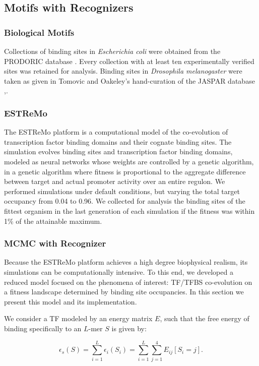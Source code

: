 \documentclass{article}
\begin{document}
\subsection{Motifs with Recognizers}
\subsubsection{Biological Motifs}
Collections of binding sites in \textit{Escherichia coli} were
obtained from the PRODORIC database \cite{prodoric03}.  Every
collection with at least ten experimentally verified sites was
retained for analysis.  Binding sites in \textit{Drosophila
  melanogaster} were taken as given in Tomovic and Oakeley's
hand-curation of the JASPAR database \cite{tomovic07},\cite{jaspar}.
\subsubsection{ESTReMo}
The ESTReMo platform is a computational model of the co-evolution of
transcription factor binding domains and their cognate binding sites.
The simulation evolves binding sites and transcription factor binding
domains, modeled as neural networks whose weights are controlled by a
genetic algorithm, in a genetic algorithm where fitness is
proportional to the aggregate difference between target and actual
promoter activity over an entire regulon.  We performed simulations
under default conditions, but varying the total target occupancy from
0.04 to 0.96.  We collected for analysis the binding sites of the
fittest organism in the last generation of each simulation if the
fitness was within 1\% of the attainable maximum.

\subsubsection{MCMC with Recognizer}
\label{sec:mcmc_with_recognizer}
Because the ESTReMo platform achieves a high degree biophysical
realism, its simulations can be computationally intensive.  To this
end, we developed a reduced model focused on the phenomena of
interest: TF/TFBS co-evolution on a fitness landscape determined by
binding site occupancies.  In this section we present this model and
its implementation.

We consider a TF modeled by an energy matrix $E$, such that the free
energy of binding specifically to an $L$-mer $S$ is given by:

\begin{equation}
  \label{eq:site_scoring}
  \epsilon_{s}(S) = \sum_{i=1}^L\epsilon_i(S_i) = \sum_{i=1}^L\sum_{j=1}^4E_{ij}[S_i=j].
\end{equation}
\end{document}
